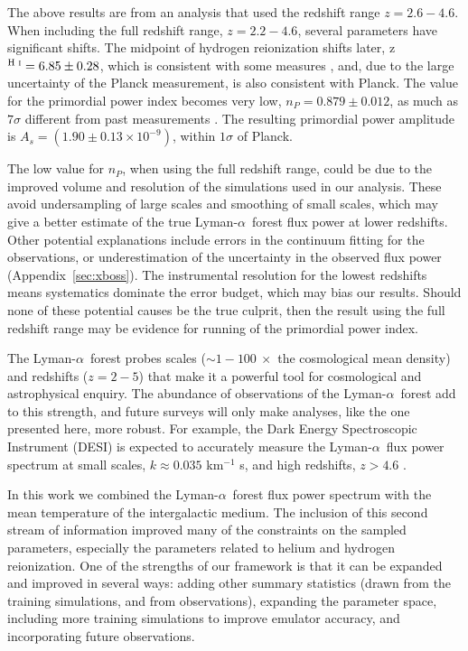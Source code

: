 \documentclass[a4paper,11pt]{article}
\newcommand{\lya}{Lyman-$\alpha$\ }
\begin{document}
The above results are from an analysis that used the redshift range $z=2.6-4.6$.
When including the full redshift range, $z=2.2-4.6$, several parameters have significant shifts.
The midpoint of hydrogen reionization shifts later, z$^{\text{H~{\sc i}}}=6.85\pm0.28$, which is consistent with some measures \cite{2021ApJ...919..120M}, and, due to the large uncertainty of the Planck measurement, is also consistent with Planck.
The value for the primordial power index becomes very low, $n_P=0.879\pm0.012$, as much as $7\sigma$ different from past measurements \cite{2020A&A...641A...6P, 2020JCAP...04..038P, 2019JCAP...07..017C}.
The resulting primordial power amplitude is $A_s=\left(1.90\pm0.13\times10^{-9}\right)$, within $1\sigma$ of Planck.

The low value for $n_P$, when using the full redshift range, could be due to the improved volume and resolution of the simulations used in our analysis.
These avoid undersampling of large scales and smoothing of small scales, which may give a better estimate of the true \lya forest flux power at lower redshifts.
Other potential explanations include errors in the continuum fitting for the observations, or underestimation of the uncertainty in the observed flux power (Appendix~\ref{sec:xboss}).
The instrumental resolution for the lowest redshifts means systematics dominate the error budget, which may bias our results.
Should none of these potential causes be the true culprit, then the result using the full redshift range may be evidence for running of the primordial power index.

The \lya forest probes scales ($\sim 1-100 \ \times$ the cosmological mean density) and redshifts ($z=2-5$) that make it a powerful tool for cosmological and astrophysical enquiry.
The abundance of observations of the \lya forest add to this strength, and future surveys will only make analyses, like the one presented here, more robust.
For example, the Dark Energy Spectroscopic Instrument (DESI) \cite{2022AJ....164..207A} is expected to accurately measure the \lya flux power spectrum at small scales, $k\approx0.035$ km$^{-1}$ s, and high redshifts, $z>4.6$ \citep{2022arXiv220307491V}.

In this work we combined the \lya forest flux power spectrum with the mean temperature of the intergalactic medium.
The inclusion of this second stream of information improved many of the constraints on the sampled parameters, especially the parameters related to helium and hydrogen reionization.
One of the strengths of our framework is that it can be expanded and improved in several ways: adding other summary statistics (drawn from the training simulations, and from observations), expanding the parameter space, including more training simulations to improve emulator accuracy, and incorporating future observations.
\end{document}
